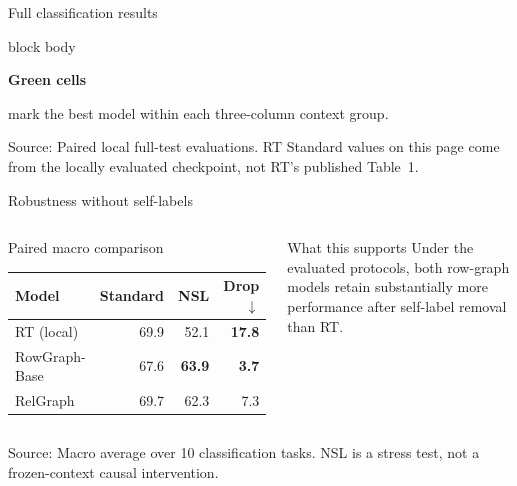 \documentclass[aspectratio=169,10pt,t]{beamer}
\newcommand{\source}[1]{\vfill\par{\fontsize{6.3}{7.2}\selectfont\color{Muted}Source: #1}}
\newcommand{\good}[1]{{\bfseries\color{Green}#1}}
\newcommand{\bad}[1]{{\bfseries\color{Red}#1}}
\begin{document}
\begin{frame}{Full classification results}
  \vspace{.22cm}
  \begin{beamercolorbox}[sep=.42em,wd=.82\linewidth]{block body}
    \centering\scriptsize
    \colorbox{PaleTeal}{\strut\good{Green cells}} mark the best model within each three-column context group.
  \end{beamercolorbox}
  \source{Paired local full-test evaluations. RT Standard values on this page come from the locally evaluated checkpoint, not RT's published Table~1.}
\end{frame}



\begin{frame}{Robustness without self-labels}
  \begin{columns}[T,onlytextwidth]
      \vspace{0pt}
      \begin{block}{Paired macro comparison}
        \renewcommand{\arraystretch}{1.35}
        \begin{tabularx}{\linewidth}{Xrrr}
          \toprule
          Model & Standard & NSL & Drop $\downarrow$ \\
          \midrule
          RT (local) & 69.9 & 52.1 & \bad{17.8} \\
          \rowcolor{PaleTeal}RowGraph-Base & 67.6 & \good{63.9} & \good{3.7} \\
          RelGraph & 69.7 & 62.3 & 7.3 \\
          \bottomrule
        \end{tabularx}
      \end{block}

      \vspace{0pt}
      \begin{exampleblock}{What this supports}
         Under the evaluated protocols, both row-graph models retain substantially more performance after self-label removal than RT.
      \end{exampleblock}
      \vspace{.18cm}
  \end{columns}
  \source{Macro average over 10 classification tasks. NSL is a stress test, not a frozen-context causal intervention.}
\end{frame}
\end{document}
